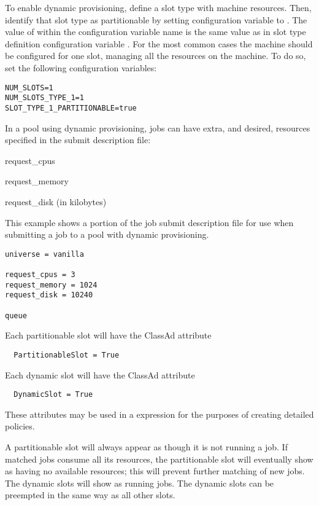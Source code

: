 To enable dynamic provisioning, 
define a slot type with machine resources.
Then,
identify that slot type as partitionable by setting
configuration variable 
to .
The value of  within the configuration variable name
is the same value as in slot type definition configuration variable
.
For the most common cases the machine should
be configured for one slot, managing all the resources on the machine.
To do so, set the following configuration variables:

\begin{verbatim}
NUM_SLOTS=1
NUM_SLOTS_TYPE_1=1
SLOT_TYPE_1_PARTITIONABLE=true
\end{verbatim}

In a pool using dynamic provisioning, 
jobs can have extra, and desired, resources specified in the submit
description file:
\begin{description}
  \item{request\_cpus}
  \item{request\_memory}
  \item{request\_disk (in kilobytes)}
\end{description}

This example shows a portion of the job submit description file
for use when submitting a job to a pool with dynamic provisioning.
\begin{verbatim}
universe = vanilla

request_cpus = 3
request_memory = 1024
request_disk = 10240

queue 
\end{verbatim}

Each partitionable slot will have
the ClassAd attribute
\begin{verbatim}
  PartitionableSlot = True
\end{verbatim}
Each dynamic slot will have the ClassAd attribute 
\begin{verbatim}
  DynamicSlot = True
\end{verbatim}
These attributes may be used in a  expression for 
the purposes of creating detailed policies.

A partitionable slot will always appear as though it is not running a job.
If matched jobs consume all its resources,
the partitionable slot  will eventually show as having no available resources; 
this will prevent further matching of new jobs.
The dynamic slots will show as running jobs.
The dynamic slots can be preempted in the same way as all other slots.

